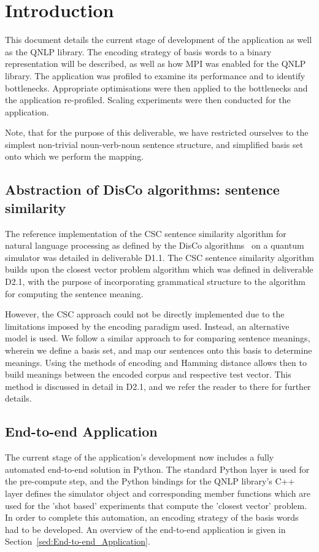 \section{Introduction}
\label{sec:introduction}

This document details the current stage of development of the application as well as the QNLP library. The encoding strategy of basis words to a binary representation will be described, as well as how MPI was enabled for the QNLP library. The application was profiled to examine its performance and to identify bottlenecks. Appropriate optimisations were then applied to the bottlenecks and the application re-profiled. Scaling experiments were then conducted for the application.

Note, that for the purpose of this deliverable, we have restricted ourselves to the simplest non-trivial noun-verb-noun sentence structure, and simplified basis set onto which we perform the mapping. 

\subsection{Abstraction of DisCo algorithms: sentence similarity}
\label{sec:abstraction_of_disco_algorithms}
The reference implementation of the CSC sentence similarity algorithm for natural language processing as defined by the DisCo algorithms~\cite{Zeng_Coecke_2016, clark_coecke_sadrzadeh_2010, Coecke_Sadrzadeh_Clark_2010} on a quantum simulator was detailed in deliverable D1.1. The CSC sentence similarity algorithm builds upon the closest vector problem algorithm which was defined in deliverable D2.1, with the purpose of incorporating grammatical structure to the algorithm for computing the sentence meaning.

However, the CSC approach could not be directly implemented due to the limitations imposed by the encoding paradigm used. Instead, an alternative model is used. We follow a similar approach to \cite{clark_coecke_sadrzadeh_2010} for comparing sentence meanings, wherein we define a basis set, and map our sentences onto this basis to determine meanings. Using the methods of encoding and Hamming distance allows then to build meanings between the encoded corpus and respective test vector. This method is discussed in detail in D2.1, and we refer the reader to there for further details.

\subsection{End-to-end Application}
\label{sec:intro_end_to_end}
The current stage of the application's development now includes a fully automated end-to-end solution in Python. The standard Python layer is used for the pre-compute step, and the Python bindings for the QNLP library's C++ layer defines the simulator object and corresponding member functions which are used for the 'shot based' experiments that compute the 'closest vector' problem. In order to complete this automation, an encoding strategy of the basis words had to be developed. An overview of the end-to-end application is given in Section~\ref{sed:End-to-end_Application}.

